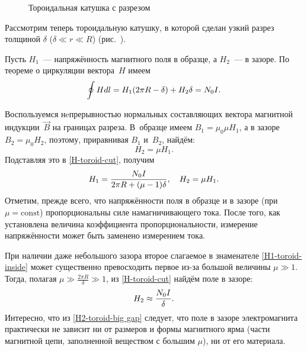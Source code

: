 \begin{wrapfigure}{o}{0.3\textwidth}
    \centering
    \caption{Тороидальная катушка с разрезом}
\end{wrapfigure}

Рассмотрим теперь тороидальную катушку, в которой сделан узкий разрез толщиной
$\delta$ ($\delta \ll r \ll R$) (рис.~).

Пусть $H_1$~--- напряжённость магнитного поля в
образце, а $H_2$~--- в зазоре. По теореме о циркуляции вектора~$H$ имеем
\begin{equation}
	\eqmark{H-toroid-cut}
	\oint {Hdl} = H_1 (2\pi R - \delta) + H_2 \delta  = N_0 I.
\end{equation}

Воспользуемся нeпрерывностью нормальных составляющих вектора магнитной
индукции~$\vec{B}$ на границах разреза. В~образце имеем $B_1 = \mu_0 \mu H_1$,
а в зазоре $B_2 = \mu_0 H_2$, поэтому, приравнивая $B_1$ и~$B_2$, найдём:
\begin{equation*}H_2 = \mu H_1.\end{equation*}
Подставляя это в \eqref{H-toroid-cut}, получим
\begin{equation}
	\eqmark{H1-toroid-inside}
	H_1 = \frac{N_0 I}{2\pi R + (\mu - 1)\delta},\quad H_2 = \mu H_1.
\end{equation}
Отметим, прежде всего, что напряжённости поля в образце и в зазоре
(при $\mu = \mathrm{const}$) пропорциональны силе намагничивающего тока.
После того, как установлена величина коэффициента
пропорциональности, измерение напряжённости может быть заменено измерением тока.

При наличии даже небольшого зазора второе слагаемое в знаменателе
\eqref{H1-toroid-inside} может существенно превосходить первое из-за большой величины
$\mu\gg1$. Тогда, полагая $\mu\gg \frac{2\pi R}{\delta}\gg 1$, из
\eqref{H-toroid-cut} найдём поле в зазоре:
\begin{equation}
	\eqmark{H2-toroid-big gap}
	H_2 \approx \frac{N_0 I}{\delta}.
\end{equation}
Интересно, что из \eqref{H2-toroid-big gap} следует, что поле в зазоре
электромагнита практически не зависит ни от размеров и формы магнитного ярма (части
магнитной цепи, заполненной веществом с большим $\mu$), ни от его материала.



